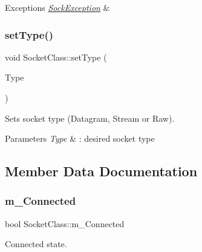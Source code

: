 \begin{DoxyExceptions}{Exceptions}
{\em \hyperlink{classSockException}{Sock\+Exception}} & \\
\hline
\end{DoxyExceptions}
\mbox{\label{classSocketClass_aac96804301f30f4df5b999ac7526c0a9}} 
\subsubsection{\texorpdfstring{set\+Type()}{setType()}}
{\footnotesize\ttfamily void Socket\+Class\+::set\+Type (\begin{DoxyParamCaption}\item[{\hyperlink{classSocketClass_a2182dd9fee09459fabb99e6ae717f595}{Sock\+Type}}]{Type }\end{DoxyParamCaption})\hspace{0.3cm}{\ttfamily [inline]}}

Sets socket type (Datagram, Stream or Raw). 
\begin{DoxyParams}{Parameters}
{\em Type} & \+: desired socket type \\
\hline
\end{DoxyParams}


\subsection{Member Data Documentation}
\mbox{\label{classSocketClass_aad81b86c88c024b5ccc77d89cbaea8e8}} 
\subsubsection{\texorpdfstring{m\+\_\+\+Connected}{m\_Connected}}
{\footnotesize\ttfamily bool Socket\+Class\+::m\+\_\+\+Connected\hspace{0.3cm}{\ttfamily [protected]}}



Connected state. 

\mbox{\label{classSocketClass_a42a3afe9243529dce5144b8cc5ebf82c}} 
